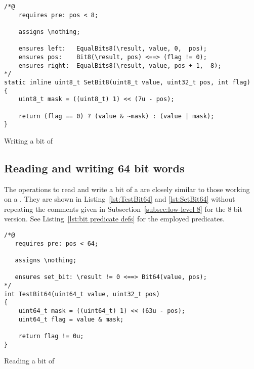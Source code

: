 \begin{listing}[hbt]
\begin{minipage}{0.99\textwidth}
\begin{lstlisting}[style=acsl-block]
/*@
    requires pre: pos < 8;

    assigns \nothing;

    ensures left:   EqualBits8(\result, value, 0,  pos);
    ensures pos:    Bit8(\result, pos) <==> (flag != 0);
    ensures right:  EqualBits8(\result, value, pos + 1,  8);
*/
static inline uint8_t SetBit8(uint8_t value, uint32_t pos, int flag)
{
    uint8_t mask = ((uint8_t) 1) << (7u - pos);

    return (flag == 0) ? (value & ~mask) : (value | mask);
}
\end{lstlisting}
\end{minipage}
\caption{\label{lst:SetBit8}Writing a bit of }
\end{listing}


\FloatBarrier

\subsection{Reading and writing 64 bit words}
\label{subsec:low-level 64}



The operations to read and write a bit of a 
are closely similar to
those working on a .
%
They are shown in Listing~\ref{lst:TestBit64}
and \ref{lst:SetBit64} without repeating the comments given
in Subsection~\ref{subsec:low-level 8} for the 8 bit version.
%
See Listing~\ref{lst:bit predicate defs} for the employed \acsl predicates.

\begin{listing}[hbt]
\begin{minipage}{0.99\textwidth}
\begin{lstlisting}[style=acsl-block]
/*@
   requires pre: pos < 64;

   assigns \nothing;

   ensures set_bit: \result != 0 <==> Bit64(value, pos);
*/
int TestBit64(uint64_t value, uint32_t pos)
{
    uint64_t mask = ((uint64_t) 1) << (63u - pos);
    uint64_t flag = value & mask;

    return flag != 0u;
}
\end{lstlisting}
\end{minipage}
\caption{\label{lst:TestBit64}Reading a bit of }
\end{listing}

